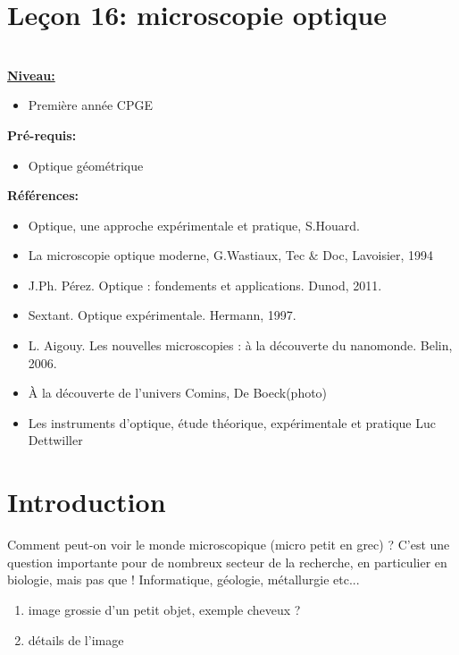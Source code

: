 \documentclass[french, a4paper, 10pt, twocolumn, landscape]{article}
\begin{document}
\section*{Leçon 16: microscopie optique}

\hrulefill\\

\noindent\underline{\textbf{Niveau:}} 
\begin{itemize}
    \item Première année CPGE
\end{itemize}

\textbf{Pré-requis:}
\begin{itemize}
    \item Optique géométrique
\end{itemize}

\textbf{Références:}\medskip

\begin{itemize}
	\item Optique, une approche expérimentale et pratique,
	S.Houard.
	\item La microscopie optique moderne, G.Wastiaux,
	Tec $\&$ Doc, Lavoisier, 1994
	\item J.Ph. Pérez. Optique : fondements et applications. Dunod, 2011.
	\item Sextant. Optique expérimentale. Hermann, 1997.
	\item L. Aigouy. Les nouvelles microscopies : à la découverte du nanomonde.
	Belin, 2006.
	\item À la découverte de l'univers  Comins, De Boeck(photo)
	\item Les instruments d'optique, étude théorique, expérimentale et pratique Luc Dettwiller
\end{itemize}

\hrulefill



\section*{Introduction}

Comment peut-on voir le monde microscopique (micro petit en grec) ? 
C'est une question importante pour de nombreux secteur de la recherche, en particulier en biologie, mais pas que ! 
Informatique, géologie, métallurgie etc... 

\begin{enumerate}
\item image grossie d'un petit objet, exemple cheveux ? 
\item détails de l'image 
\end{enumerate}
\end{document}
